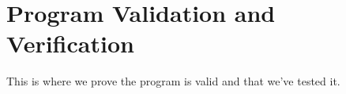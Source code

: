 \documentclass[11pt,a4paper]{article}
\begin{document}
\section{Program Validation and Verification}
\label{s:progr-valid-verif}
%
%
%
%
%
This is where we prove the program is valid and that we've tested it.
\end{document}
